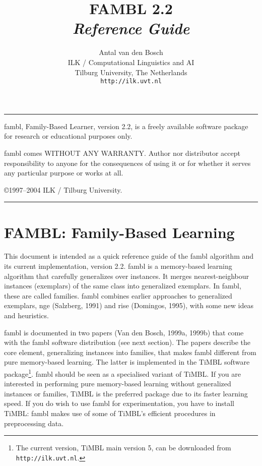 \documentclass[11pt]{article}
\begin{document}
\title{FAMBL 2.2 \\ {\sl Reference Guide}}
\author{Antal van den Bosch \\ ILK / Computational Linguistics and AI\\
Tilburg University, The Netherlands \\ {\tt http://ilk.uvt.nl} }

\maketitle

\vspace*{6cm}

\rule{\textwidth}{1.0mm}

{\sc fambl}, Family-Based Learner, version 2.2, is a freely available
software package for research or educational purposes only. 

{\sc fambl} comes WITHOUT ANY WARRANTY. Author nor distributor accept
responsibility to anyone for the consequences of using it or for
whether it serves any particular purpose or works at all.

\copyright 1997--2004 ILK / Tilburg University.

\rule{\textwidth}{0.5mm}

\clearpage

\section{FAMBL: Family-Based Learning}

This document is intended as a quick reference guide of the {\sc
fambl} algorithm and its current implementation, version 2.2. {\sc
fambl} is a memory-based learning algorithm that carefully generalizes
over instances. It merges nearest-neighbour instances (exemplars) of
the same class into generalized exemplars. In {\sc fambl}, these are
called families. {\sc fambl} combines earlier approaches to
generalized exemplars, {\sc nge} (Salzberg, 1991) and {\sc rise}
(Domingos, 1995), with some new ideas and heuristics.

{\sc fambl} is documented in two papers (Van den Bosch, 1999a, 1999b)
that come with the {\sc fambl} software distribution (see next
section). The papers describe the core element, generalizing instances
into families, that makes {\sc fambl} different from pure memory-based
learning. The latter is implemented in the TiMBL software
package\footnote{The current version, TiMBL main version 5, can be
  downloaded from {\tt http://ilk.uvt.nl}.}. {\sc fambl} should be
seen as a specialised variant of TiMBL. If you are interested in
performing pure memory-based learning without generalized instances or
families, TiMBL is the preferred package due to its faster learning
speed. If you do wish to use {\sc fambl} for experimentation, you have
to install TiMBL: {\sc fambl} makes use of some of TiMBL's efficient
procedures in preprocessing data.
\end{document}

